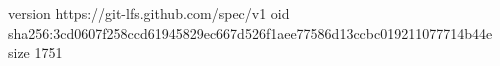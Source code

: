 version https://git-lfs.github.com/spec/v1
oid sha256:3cd0607f258ccd61945829ec667d526f1aee77586d13ccbc019211077714b44e
size 1751

